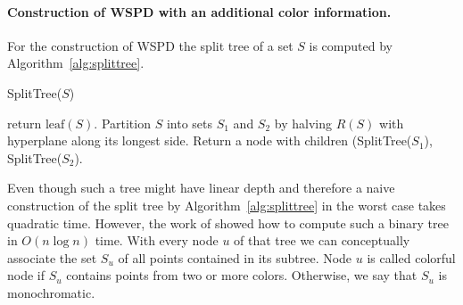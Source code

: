 \documentclass[a4paper,UKenglish,cleveref, autoref, thm-restate]{lipics-v2021}
\begin{document}
\paragraph{Construction of WSPD with an additional color information.} For the construction of WSPD the split tree of a 
set $S$ is computed by Algorithm~\ref{alg:splittree}.
\begin{algorithm}
\caption{SplitTree($S$)}\label{alg:splittree}
\begin{algorithmic}
    \State return $\textrm{leaf}(S)$.
    \Else
    \State Partition $S$ into sets $S_1$ and $S_2$ by halving $R(S)$ with hyperplane along its longest side. 
    \State Return a node with children (SplitTree($S_1$), SplitTree($S_2$).
    \EndIf
\end{algorithmic}
\end{algorithm}
Even though such a tree might have linear depth and therefore a naive construction of the split tree by Algorithm~\ref{alg:splittree} in the worst case takes
quadratic time. However, the work of \cite{callahan95} showed how to compute such a binary tree in $O(n\log n)$ time. With every 
node $u$ of that tree we can conceptually associate the set $S_u$ of all points contained in its subtree. Node $u$
is called colorful node if $S_u$ contains points from two or more colors. Otherwise, we say that $S_u$ is monochromatic. 
\end{document}
